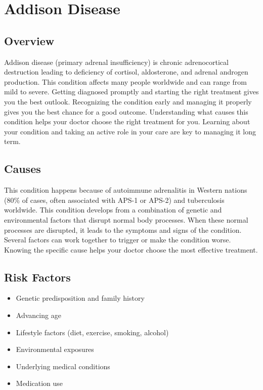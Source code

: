 \chapter{Addison Disease}
\label{sec:Addison Disease}

\section{Overview}
Addison disease (primary adrenal insufficiency) is chronic adrenocortical destruction leading to deficiency of cortisol, aldosterone, and adrenal androgen production. This condition affects many people worldwide and can range from mild to severe. Getting diagnosed promptly and starting the right treatment gives you the best outlook. Recognizing the condition early and managing it properly gives you the best chance for a good outcome. Understanding what causes this condition helps your doctor choose the right treatment for you. Learning about your condition and taking an active role in your care are key to managing it long term.

\section{Causes}
This condition happens because of autoimmune adrenalitis in Western nations (80\% of cases, often associated with APS-1 or APS-2) and tuberculosis worldwide. This condition develops from a combination of genetic and environmental factors that disrupt normal body processes. When these normal processes are disrupted, it leads to the symptoms and signs of the condition. Several factors can work together to trigger or make the condition worse. Knowing the specific cause helps your doctor choose the most effective treatment.

\section{Risk Factors}

\begin{itemize}[noitemsep]
  \item Genetic predisposition and family history
  \item Advancing age
  \item Lifestyle factors (diet, exercise, smoking, alcohol)
  \item Environmental exposures
  \item Underlying medical conditions
  \item Medication use
\end{itemize}

